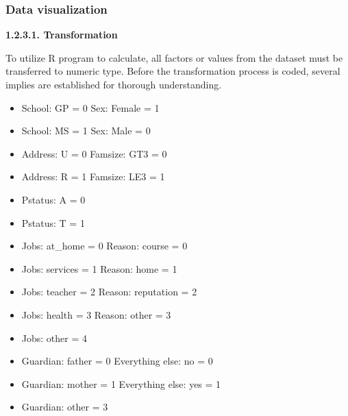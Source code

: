 \documentclass[a4paper]{article}
\begin{document}
\subsubsection{Data visualization}
\vspace{0.4cm}
\textbf{1.2.3.1. Transformation} \\ \newline
{}
To utilize R program to calculate, all factors or values from the dataset must be transferred to numeric type. Before the transformation process is coded, several implies are established for thorough understanding.
\begin{itemize}
    \item School: GP = 0 \hspace{5cm} Sex: Female = 1 
    \item School: MS = 1 \hspace{5cm} Sex: Male = 0\\  
    \item Address: U = 0 \hspace{5cm} Famsize: GT3 = 0
    \item Address: R = 1 \hspace{5cm} Famsize: LE3 = 1 \\
    \item Pstatus: A = 0
    \item Pstatus: T = 1 \\
    \item Jobs: at\_home = 0 \hspace{4.52cm} Reason: course = 0
    \item Jobs: services = 1 \hspace{4.61cm} Reason: home = 1
    \item Jobs: teacher = 2  \hspace{4.69cm} Reason: reputation = 2
    \item Jobs: health = 3   \hspace{4.84cm} Reason: other = 3 
    \item Jobs: other = 4 \\
    \item Guardian: father = 0 \hspace{4.17cm} Everything else: no = 0
    \item Guardian: mother = 1 \hspace{4.0cm} Everything else: yes = 1
    \item Guardian: other = 3 \\             
\end{itemize}
\end{document}
